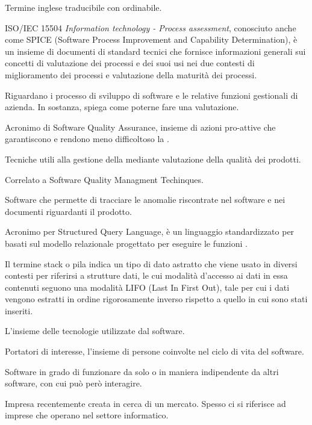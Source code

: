 Termine inglese traducibile con ordinabile.

ISO/IEC 15504 \emph{Information technology - Process assessment}, conosciuto anche come SPICE (Software Process Improvement and Capability Determination), è un insieme di documenti di standard tecnici che fornisce informazioni generali sui concetti di valutazione dei processi e dei suoi usi nei due contesti di miglioramento dei processi e valutazione della maturità dei processi.

Riguardano i processo di sviluppo di software e le relative funzioni gestionali di azienda. In sostanza, spiega come poterne fare una valutazione.

Acronimo di Software Quality Assurance, insieme di azioni pro-attive che garantiscono  e rendono meno difficoltoso la .

Tecniche utili alla gestione della  mediante valutazione della qualità dei prodotti.

Correlato a Software Quality Managment Techinques.

Software che permette di tracciare le anomalie riscontrate nel software e nei documenti riguardanti il prodotto.

Acronimo per Structured Query Language, è un linguaggio standardizzato per  basati sul modello relazionale progettato per eseguire le funzioni .

Il termine stack o pila indica un tipo di dato astratto che viene usato in diversi contesti per riferirsi a strutture dati, le cui modalità d'accesso ai dati in essa contenuti seguono una modalità LIFO (Last In First Out), tale per cui i dati vengono estratti in ordine rigorosamente inverso rispetto a quello in cui sono stati inseriti.

L'insieme delle tecnologie utilizzate dal software.

Portatori di interesse, l'insieme di persone coinvolte nel ciclo di vita del software.

Software in grado di funzionare da solo o in maniera indipendente da altri software, con cui può però interagire.

Impresa recentemente creata in cerca di un mercato. Spesso ci si riferisce ad imprese che operano nel settore informatico.

